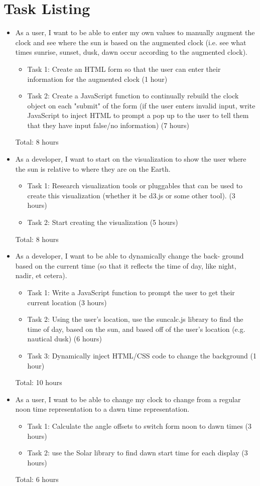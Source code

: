 \documentclass[11pt]{article}
\begin{document}
	\section{Task Listing}
		\vspace{-3mm}
		\begin{itemize}
			\item As a user, I want to be able to enter my own values to manually augment the clock and see where the sun is based on the augmented clock (i.e. see what times sunrise, sunset, dusk, dawn occur according to the augmented clock).
			\begin{itemize}
			    \item Task 1: Create an HTML form so that the user can enter their information for the augmented clock (1 hour)
			    \item Task 2: Create a JavaScript function to continually rebuild the clock object on each "submit" of the form (if the user enters invalid input, write JavaScript to inject HTML to prompt a pop up to the user to tell them that they have input false/no information) (7 hours)
			\end{itemize}
			Total: 8 hours
			\item As a developer, I want to start on the visualization to show the user where the sun is relative to where they are on the Earth.
			\begin{itemize}
			    \item Task 1: Research visualization tools or pluggables that can be used to create this visualization (whether it be d3.js or some other tool). (3 hours)
			    \item Task 2: Start creating the visualization (5 hours)
			\end{itemize}
			Total: 8 hours
			\item As a developer, I want to be able to dynamically change the back- ground based on the current time (so that it reflects the time of day, like night, nadir, et cetera).
			\begin{itemize}
			    \item Task 1: Write a JavaScript function to prompt the user to get their current location (3 hours)
			    \item Task 2: Using the user's location, use the suncalc.js library to find the time of day, based on the sun, and based off of the user's location (e.g. nautical dusk) (6 hours)
			    \item Task 3: Dynamically inject HTML/CSS code to change the background (1 hour)
			\end{itemize}
			 Total: 10 hours
			 \item As a user, I want to be able to change my clock to change from a regular noon time representation to a dawn time representation.
			 \begin{itemize}
				\item Task 1:  Calculate the angle offsets to switch form noon to dawn times (3 hours)
				\item Task 2:  use the Solar library to find dawn start time for each display (3 hours)
			\end{itemize}
			Total: 6 hours
		\end{itemize}
\end{document}
